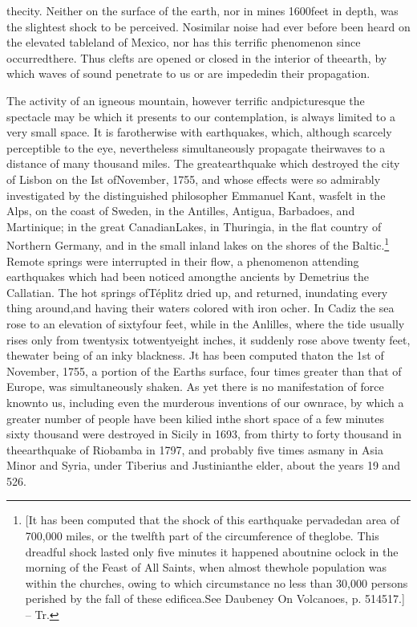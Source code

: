 thecity. Neither on the surface of the earth, nor in mines 1600feet in depth, was the slightest shock to be perceived. Nosimilar noise had ever before been heard on the elevated tableland of Mexico, nor has this terrific phenomenon since occurredthere. Thus clefts are opened or closed in the interior of theearth, by which waves of sound penetrate to us or are impededin their propagation. 

The activity of an igneous mountain, however terrific andpicturesque the spectacle may be which it presents to our contemplation, is always limited to a very small space. It is farotherwise with earthquakes, which, although scarcely perceptible to the eye, nevertheless simultaneously propagate theirwaves to a distance of many thousand miles. The greatearthquake which destroyed the city of Lisbon on the Ist ofNovember, 1755, and whose effects were so admirably investigated by the distinguished philosopher Emmanuel Kant, wasfelt in the Alps, on the coast of Sweden, in the Antilles, Antigua, Barbadoes, and Martinique; in the great CanadianLakes, in Thuringia, in the flat country of Northern Germany, and in the small inland lakes on the shores of the Baltic.\footnote{[It has been computed that the shock of this earthquake pervadedan area of 700,000 miles, or the twelfth part of the circumference of theglobe. This dreadful shock lasted only five minutes it happened aboutnine oclock in the morning of the Feast of All Saints, when almost thewhole population was within the churches, owing to which circumstance no less than 30,000 persons perished by the fall of these edificea.See Daubeney On Volcanoes, p. 514517.] -- Tr.} Remote springs were interrupted in their flow, a phenomenon attending earthquakes which had been noticed amongthe ancients by Demetrius the Callatian. The hot springs ofT\'{e}plitz dried up, and returned, inundating every thing around,and having their waters colored with iron ocher. In Cadiz the sea rose to an elevation of sixtyfour feet, while in the Anlilles, where the tide usually rises only from twentysix totwentyeight inches, it suddenly rose above twenty feet, thewater being of an inky blackness. Jt has been computed thaton the 1st of November, 1755, a portion of the Earths surface, four times greater than that of Europe, was simultaneously shaken. As yet there is no manifestation of force knownto us, including even the murderous inventions of our ownrace, by which a greater number of people have been kilied inthe short space of a few minutes sixty thousand were destroyed in Sicily in 1693, from thirty to forty thousand in theearthquake of Riobamba in 1797, and probably five times asmany in Asia Minor and Syria, under Tiberius and Justinianthe elder, about the years 19 and 526.

